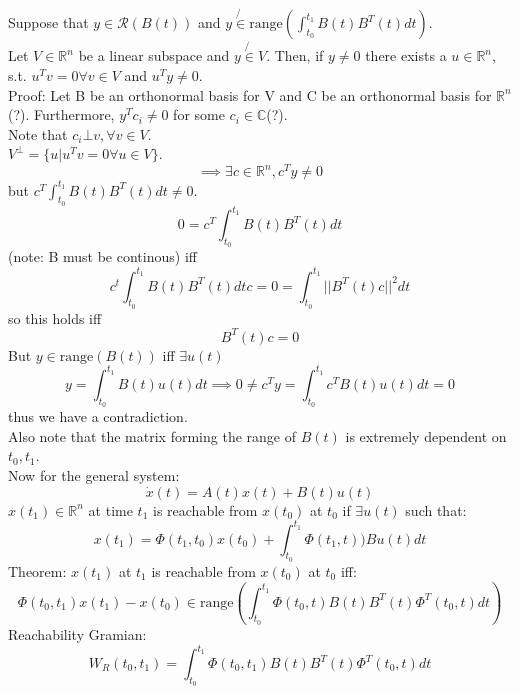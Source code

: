 \documentclass{article}
\newcommand{\rng}{\text{range}}
\begin{document}
Suppose that $y\in \mathcal{R}(B(t))$ and $y\not{\in}\rng\left (\int_{t_0}^{t_1}B(t)B^T(t)dt\right )$.\\

Let $V\in\mathbb{R}^n$ be a linear subspace and $y\not{\in}V$. Then, if $y\neq 0$ there exists a $u\in\mathbb{R}^n$, s.t. $u^Tv=0 \forall v\in V$ and $u^Ty\neq 0$.\\
Proof: Let B be an orthonormal basis for V and C be an orthonormal basis for $\mathbb{R}^n$(?). Furthermore, $y^Tc_i\neq 0$ for some $c_i\in\mathbb{C}$(?).\\
Note that $c_i\bot v,\forall v\in V$.\\
$V^{\bot}=\{u\bigg| u^Tv=0 \forall u\in V\}$.\\
\[\implies \exists c\in\mathbb{R}^n, c^Ty\neq 0\]
but $c^T\int_{t_0}^{t_1}B(t)B^T(t)dt\neq 0$.\\
\[0=c^T\int_{t_0}^{t_1}B(t)B^T(t)dt\]
(note: B must be continous) iff\\
\[c^t\int_{t_0}^{t_1}B(t)B^T(t)dt c=0=\int_{t_0}^{t_1}\lvert\lvert B^T(t)c\rvert\rvert^2dt\]
so this holds iff\\
\[B^T(t)c=0\]
But $y\in\rng(B(t))$ iff $\exists u(t)$\\
\[y=\int_{t_0}^{t_1}B(t)u(t)dt\implies 0\neq c^Ty=\int_{t_0}^{t_1}c^TB(t)u(t)dt=0\]
thus we have a contradiction.\\
Also note that the matrix forming the range of $B(t)$ is extremely dependent on $t_0,t_1$.\\

Now for the general system:\\
\[\dot{x}(t)=A(t)x(t)+B(t)u(t)\]
$x(t_1)\in\mathbb{R}^n$ at time $t_1$ is reachable from $x(t_0)$ at $t_0$ if $\exists u(t)$ such that:\\
\[x(t_1)=\Phi(t_1,t_0)x(t_0)+\int_{t_0}^{t_1}\Phi(t_1,t))Bu(t)dt\]
Theorem: $x(t_1)$ at $t_1$ is reachable from $x(t_0)$ at $t_0$ iff:\\
\[\Phi(t_0,t_1)x(t_1)-x(t_0)\in\rng\left (\int_{t_0}^{t_1}\Phi(t_0,t)B(t)B^T(t)\Phi^T(t_0,t)dt\right )\]
Reachability Gramian:\\
\[W_R(t_0,t_1)=\int_{t_0}^{t_1}\Phi(t_0,t_1)B(t)B^T(t)\Phi^T(t_0,t)dt\]
\end{document}
